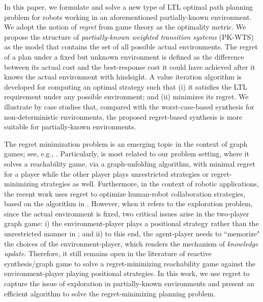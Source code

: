 \documentclass{ifacconf}
\begin{document}
In this paper, we formulate and solve a new type of LTL optimal path planning problem for robots working in an aforementioned partially-known environment. We adopt the notion of \emph{regret} from game theory \cite{yannakakis2018artificial} as the optimality metric. We propose the structure of \emph{partially-known weighted transition systems} (PK-WTS) as the model that contains the set of all possible actual environments. The regret of a plan under a fixed but unknown environment is defined as the difference between its actual cost and the best-response cost it could have achieved after it knows the actual environment with hindsight. A value iteration algorithm is developed for computing an optimal  strategy such that (i) it satisfies the LTL requirement under any possible environment; and (ii) minimizes its regret. 
We illustrate by case studies that, compared with the worst-case-based synthesis for non-deterministic environments, the proposed regret-based synthesis is more suitable for partially-known environments. 

The regret minimization problem is an emerging topic in the context of graph games; see, e.g.,  \cite{filiot2010iterated,hunter2017reactive,cadilhac2019impatient}. 
Particularly, \cite{filiot2010iterated} is most related to our problem setting, where it solves a reachability game, via a graph-unfolding algorithm, with minimal regret for a player while the other player plays unrestricted strategies or regret-minimizing strategies as well. 
Furthermore, in the context of robotic applications, the recent work \cite{muvvala2022let} uses regret to optimize  human-robot collaboration strategies, based on the algorithm in \cite{filiot2010iterated}.
However, 
when it refers to the exploration problem, since the actual environment is fixed, two critical issues arise in the two-player graph game: 
i) the environment-player plays a positional strategy rather than the unrestricted manner in \cite{filiot2010iterated, muvvala2022let}; and
ii) to this end, the agent-player needs to ``memorize" the choices of the environment-player, which renders the mechanism of \emph{knowledge update}.
Therefore, it still remains open in the literature of reactive synthesis/graph game to solve a regret-minimizing reachability game against the environment-player playing positional strategies.
In this work, we use regret to capture the issue of exploration in partially-known environments and present an efficient algorithm to solve the regret-minimizing planning problem.
\end{document}
